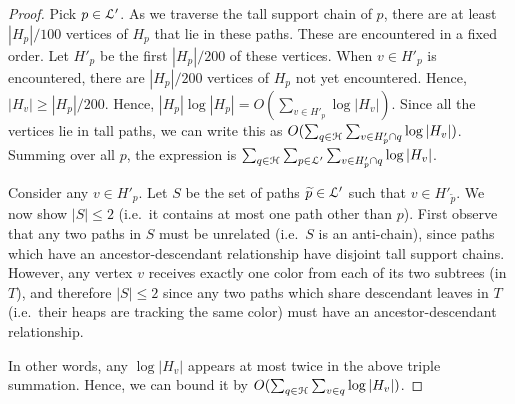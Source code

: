 {\begin{proof} 
Pick $p \in {\cal L}'$. 
%
%
As we traverse the tall support chain of $p$, there
are at least $|H_p|/100$ vertices of $H_p$ that lie in these paths. These are encountered in
a fixed order. Let $H'_p$ be the first $|H_p|/200$ of these vertices. When $v \in H'_p$
is encountered, there are $|H_p|/200$ vertices of $H_p$ not yet encountered. Hence,
$|H_v| \geq |H_p|/200$. Hence, $|H_p|\log |H_p| = O(\sum_{v \in H'_p} \log |H_v|)$.
Since all the vertices lie in tall paths,
we can write this as $O(\sum_{q \in {\cal H}} \sum_{v \in H'_p \cap q} \log |H_v|)$.
Summing over all $p$, the expression is $\sum_{q \in {\cal H}} \sum_{p \in {\cal L}'} \sum_{v \in H'_p \cap q} \log |H_v|$.

Consider any $v \in H'_p$.  Let $S$ be the set of paths $\widetilde{p}\in {\cal L}'$ such that 
$v\in H'_{\widetilde{p}}$.  We now show $|S|\leq 2$ (i.e.\ it contains at most one path other than $p$).
First observe that any two paths in $S$ must be unrelated (i.e.\ $S$ is an anti-chain), 
since paths which have an ancestor-descendant relationship have disjoint tall support chains.  
However, any vertex $v$ receives exactly one color from each of its two subtrees (in $T$), and therefore $|S|\leq 2$ since any two 
paths which share descendant leaves in $T$ (i.e.\ their heaps are tracking the same color) must have an ancestor-descendant relationship.

In other words, any $\log |H_v|$ appears at most twice in the above triple summation.
Hence, we can bound it by $O(\sum_{q \in {\cal H}} \sum_{v \in q} \log |H_v|)$.
%
%
\end{proof}

}
